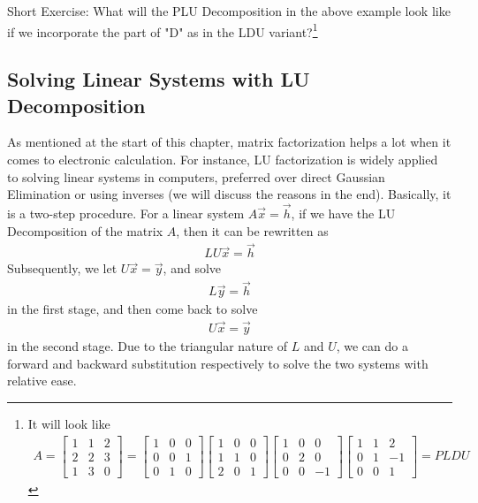 Short Exercise: What will the PLU Decomposition in the above example look like if we incorporate the part of "D" as in the LDU variant?\footnote{It will look like
\begin{align*}
A = \begin{bmatrix}
1 & 1 & 2 \\
2 & 2 & 3 \\
1 & 3 & 0
\end{bmatrix} 
=
\begin{bmatrix}
1 & 0 & 0 \\
0 & 0 & 1 \\
0 & 1 & 0    
\end{bmatrix}
\begin{bmatrix}
1 & 0 & 0 \\
1 & 1 & 0 \\
2 & 0 & 1
\end{bmatrix}
\begin{bmatrix}
1 & 0 & 0 \\
0 & 2 & 0 \\
0 & 0 & -1
\end{bmatrix}
\begin{bmatrix}
1 & 1 & 2 \\
0 & 1 & -1 \\
0 & 0 & 1 
\end{bmatrix}
= PLDU
\end{align*}}

\subsection{Solving Linear Systems with LU Decomposition}
As mentioned at the start of this chapter, matrix factorization helps a lot when it comes to electronic calculation. For instance, LU factorization is widely applied to solving linear systems in computers, preferred over direct Gaussian Elimination or using inverses (we will discuss the reasons in the end). Basically, it is a two-step procedure. For a linear system $A\vec{x} = \vec{h}$, if we have the LU Decomposition of the matrix $A$, then it can be rewritten as 
\begin{align}
LU\vec{x} = \vec{h}    
\end{align}
Subsequently, we let $U\vec{x} = \vec{y}$, and solve 
\begin{align}
L\vec{y} = \vec{h}
\end{align}
in the first stage, and then come back to solve 
\begin{align}
U\vec{x} = \vec{y}
\end{align}
in the second stage. Due to the triangular nature of $L$ and $U$, we can do a forward and backward substitution respectively to solve the two systems with relative ease.

